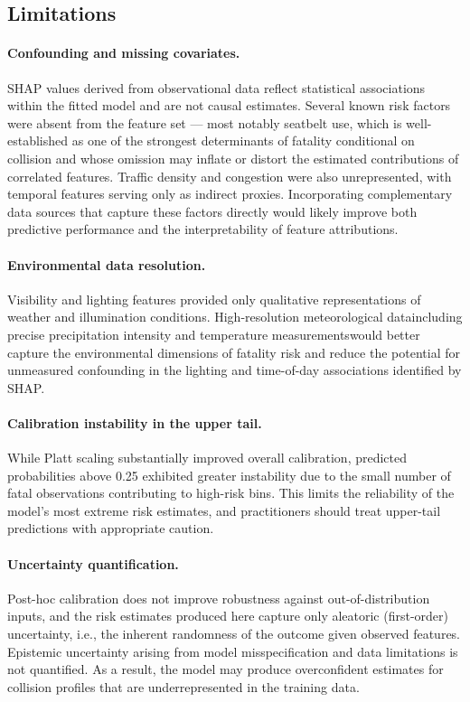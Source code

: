 \documentclass{article}
\begin{document}
\subsection*{Limitations}

\paragraph{Confounding and missing covariates.} SHAP values derived from observational data reflect statistical associations within the fitted model and are not causal estimates. Several known risk factors were absent from the feature set — most notably seatbelt use, which is well-established as one of the strongest determinants of fatality conditional on collision and whose omission may inflate or distort the estimated contributions of correlated features. Traffic density and congestion were also unrepresented, with temporal features serving only as indirect proxies. Incorporating complementary data sources that capture these factors directly would likely improve both predictive performance and the interpretability of feature attributions.

\paragraph{Environmental data resolution.} Visibility and lighting features provided only qualitative representations of weather and illumination conditions. High-resolution meteorological data\textemdash including precise precipitation intensity and temperature measurements\textemdash would better capture the environmental dimensions of fatality risk and reduce the potential for unmeasured confounding in the lighting and time-of-day associations identified by SHAP.

\paragraph{Calibration instability in the upper tail.} While Platt scaling substantially improved overall calibration, predicted probabilities above 0.25 exhibited greater instability due to the small number of fatal observations contributing to high-risk bins. This limits the reliability of the model's most extreme risk estimates, and practitioners should treat upper-tail predictions with appropriate caution.

\paragraph{Uncertainty quantification.} Post-hoc calibration does not improve robustness against out-of-distribution inputs,\cite{ovadia2019trustmodelsuncertaintyevaluating} and the risk estimates produced here capture only aleatoric (first-order) uncertainty, i.e., the inherent randomness of the outcome given observed features. Epistemic uncertainty arising from model misspecification and data limitations is not quantified. As a result, the model may produce overconfident estimates for collision profiles that are underrepresented in the training data.
\end{document}
